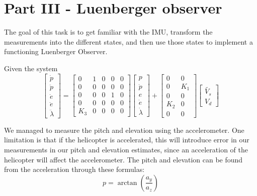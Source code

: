 \section{Part III - Luenberger observer}
The goal of this task is to get familiar with the IMU, transform the measurements into the different states, and then use those states to implement a functioning Luenberger Observer. 

Given the system
\begin{equation*}
    \begin{bmatrix}
        \dot{p} \\
        \ddot{p} \\
        \dot{e} \\
        \ddot{e} \\
        \ddot{\lambda}
    \end{bmatrix}
    =
    \begin{bmatrix}
        0 & 1 & 0 & 0 & 0 \\
        0 & 0 & 0 & 0 & 0 \\
        0 & 0 & 0 & 1 & 0 \\
        0 & 0 & 0 & 0 & 0 \\
        K_3 & 0 & 0 & 0 & 0
    \end{bmatrix}
    \begin{bmatrix}
        p \\
        \dot{p} \\
        e \\
        \dot{e} \\
        \dot{\lambda}
    \end{bmatrix}
    +
    \begin{bmatrix}
        0 & 0 \\
        0 & K_1 \\
        0 & 0 \\
        K_2 & 0 \\
        0 & 0
    \end{bmatrix}
    \begin{bmatrix}
        \tilde{V_s} \\
        V_d
    \end{bmatrix}
\end{equation*}



We managed to measure the pitch and elevation using the accelerometer. One limitation is that if the helicopter is accelerated, this will introduce error in our measurements in our pitch and elevation estimates, since an acceleration of the helicopter will affect the accelerometer. The pitch and elevation can be found from the acceleration through these formulas:
\begin{equation}
    p = \arctan\left( \frac{a_y}{a_z} \right)
\end{equation}

